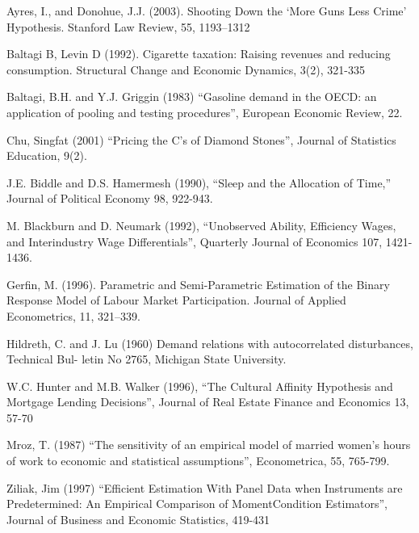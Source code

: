 \documentclass[12pt]{article}
\theoremstyle{remark}
\begin{document}
\begin{thebibliography}{99}

 Ayres, I., and Donohue, J.J. (2003). Shooting Down the ‘More Guns Less Crime’ Hypothesis. 
Stanford Law Review, 55, 1193–1312
	
 Baltagi B, Levin D (1992). Cigarette taxation: Raising revenues and reducing consumption. 
Structural Change and Economic Dynamics, 3(2), 321-335
	
Baltagi, B.H. and Y.J. Griggin (1983) “Gasoline demand in the OECD: an application of pooling and 
testing procedures”, European Economic Review, 22.
	
Chu, Singfat (2001) “Pricing the C’s of Diamond Stones”, Journal of Statistics Education, 9(2).
	
J.E. Biddle and D.S. Hamermesh (1990), “Sleep and the Allocation of Time,” 
Journal of Political Economy 98, 922-943.
	
M. Blackburn and D. Neumark (1992), “Unobserved Ability, Efficiency Wages, and Interindustry Wage Differentials”, 
Quarterly Journal of Economics 107, 1421-1436.
	
Gerfin, M. (1996). Parametric and Semi-Parametric Estimation of the Binary Response Model of Labour Market Participation. 
Journal of Applied Econometrics, 11, 321–339.
	
Hildreth, C. and J. Lu (1960) Demand relations with autocorrelated disturbances, Technical Bul- letin No 2765, Michigan State University.
	
W.C. Hunter and M.B. Walker (1996), “The Cultural Affinity Hypothesis and Mortgage Lending Decisions”, 
Journal of Real Estate Finance and Economics 13, 57-70

Mroz, T. (1987) “The sensitivity of an empirical model of married women's hours of work to economic and statistical assumptions”, 
Econometrica, 55, 765-799.

Ziliak, Jim (1997) “Efficient Estimation With Panel Data when Instruments are Predetermined: An Empirical Comparison of Moment\-Condition Estimators”, 
Journal of Business and Economic Statistics, 419-431
	
\end{thebibliography}
\end{document}
